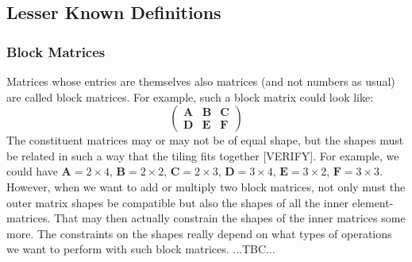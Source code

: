 







\subsection{Lesser Known Definitions}

\subsubsection{Block Matrices}
Matrices whose entries are themselves also matrices (and not numbers as usual) are called block matrices. For example, such a block matrix could look like:
\begin{equation}
\begin{pmatrix}
\mathbf{A} & \mathbf{B} & \mathbf{C} \\
\mathbf{D} & \mathbf{E} & \mathbf{F} 
\end{pmatrix}
\end{equation}
The constituent matrices may or may not be of equal shape, but the shapes must be related in such a way that the tiling fits together [VERIFY]. For example, we could have $\mathbf{A} = 2 \times 4$,  $\mathbf{B} = 2 \times 2$, $\mathbf{C} = 2 \times 3$, $\mathbf{D} = 3 \times 4$, $\mathbf{E} = 3 \times 2$, $\mathbf{F} = 3 \times 3$. However, when we want to add or multiply two block matrices, not only must the outer matrix shapes be compatible but also the shapes of all the inner element-matrices. That may then actually constrain the shapes of the inner matrices some more. The constraints on the shapes really depend on what types of operations we want to perform with such block matrices. ...TBC...


